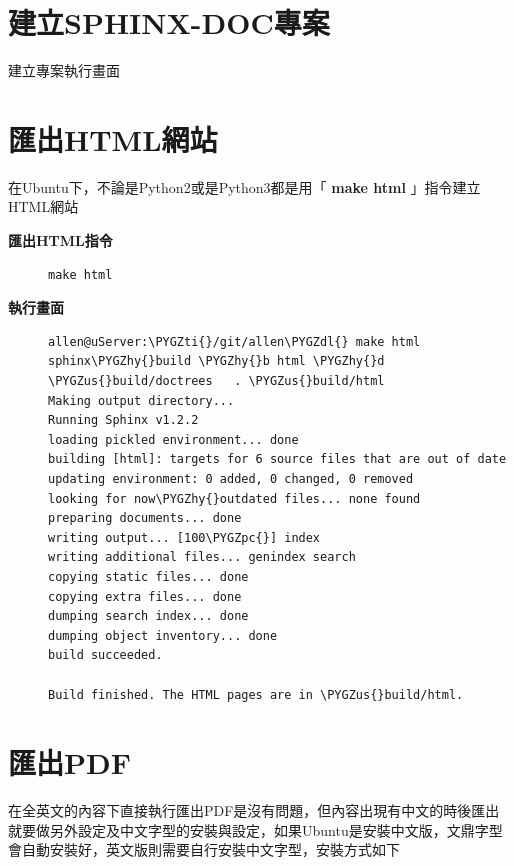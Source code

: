 \documentclass[letterpaper,10pt,english]{sphinxmanual}
\def\PYGZus{\char`\_}
\def\PYGZpc{\char`\%}
\def\PYGZdl{\char`\$}
\def\PYGZhy{\char`\-}
\def\PYGZti{\char`\~}
\begin{document}
\section{建立SPHINX-DOC專案}
\label{_doc/sphinx-doc/index:id4}
建立專案執行畫面


\section{匯出HTML網站}
\label{_doc/sphinx-doc/index:html}
在Ubuntu下，不論是Python2或是Python3都是用「 \textbf{make html} 」指令建立HTML網站
\begin{description}
\item[{\textbf{匯出HTML指令}}] \leavevmode
\begin{Verbatim}[commandchars=\\\{\}]
make html
\end{Verbatim}

\item[{\textbf{執行畫面}}] \leavevmode
\begin{Verbatim}[commandchars=\\\{\}]
allen@uServer:\PYGZti{}/git/allen\PYGZdl{} make html
sphinx\PYGZhy{}build \PYGZhy{}b html \PYGZhy{}d \PYGZus{}build/doctrees   . \PYGZus{}build/html
Making output directory...
Running Sphinx v1.2.2
loading pickled environment... done
building [html]: targets for 6 source files that are out of date
updating environment: 0 added, 0 changed, 0 removed
looking for now\PYGZhy{}outdated files... none found
preparing documents... done
writing output... [100\PYGZpc{}] index
writing additional files... genindex search
copying static files... done
copying extra files... done
dumping search index... done
dumping object inventory... done
build succeeded.

Build finished. The HTML pages are in \PYGZus{}build/html.
\end{Verbatim}

\end{description}


\section{匯出PDF}
\label{_doc/sphinx-doc/index:pdf}
在全英文的內容下直接執行匯出PDF是沒有問題，但內容出現有中文的時後匯出就要做另外設定及中文字型的安裝與設定，如果Ubuntu是安裝中文版，文鼎字型會自動安裝好，英文版則需要自行安裝中文字型，安裝方式如下
\end{document}
